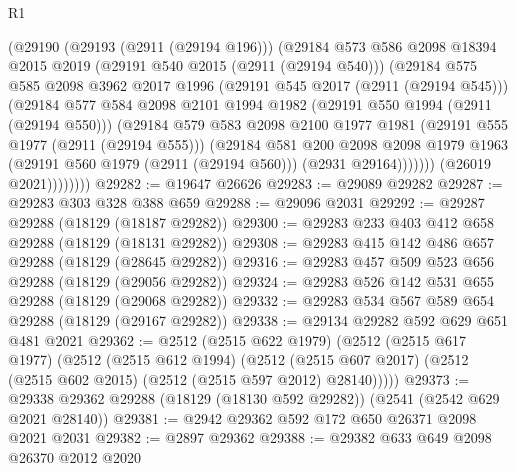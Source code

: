 \begin{lexlean}{R1}
\begin{coremodule}
                  (@29190
                    (@29193 (@2911 (@29194 @196)))
                    (@29184
                      @573
                      @586
                      @2098
                      @18394
                      @2015
                      @2019
                      (@29191 @540 @2015 (@2911 (@29194 @540)))
                      (@29184
                        @575
                        @585
                        @2098
                        @3962
                        @2017
                        @1996
                        (@29191 @545 @2017 (@2911 (@29194 @545)))
                        (@29184
                          @577
                          @584
                          @2098
                          @2101
                          @1994
                          @1982
                          (@29191 @550 @1994 (@2911 (@29194 @550)))
                          (@29184
                            @579
                            @583
                            @2098
                            @2100
                            @1977
                            @1981
                            (@29191 @555 @1977 (@2911 (@29194 @555)))
                            (@29184
                              @581
                              @200
                              @2098
                              @2098
                              @1979
                              @1963
                              (@29191 @560 @1979 (@2911 (@29194 @560)))
                              (@2931 @29164)))))))
                  (@26019 @2021))))))))
@29282 := @19647 @26626
@29283 := @29089 @29282
@29287 := @29283 @303 @328 @388 @659
@29288 := @29096 @2031
@29292 := @29287 @29288 (@18129 (@18187 @29282))
@29300 := @29283 @233 @403 @412 @658 @29288 (@18129 (@18131 @29282))
@29308 := @29283 @415 @142 @486 @657 @29288 (@18129 (@28645 @29282))
@29316 := @29283 @457 @509 @523 @656 @29288 (@18129 (@29056 @29282))
@29324 := @29283 @526 @142 @531 @655 @29288 (@18129 (@29068 @29282))
@29332 := @29283 @534 @567 @589 @654 @29288 (@18129 (@29167 @29282))
@29338 := @29134 @29282 @592 @629 @651 @481 @2021
@29362 := @2512
    (@2515 @622 @1979)
    (@2512
      (@2515 @617 @1977)
      (@2512
        (@2515 @612 @1994)
        (@2512 (@2515 @607 @2017) (@2512 (@2515 @602 @2015) (@2512 (@2515 @597 @2012) @28140)))))
@29373 := @29338 @29362 @29288 (@18129 (@18130 @592 @29282)) (@2541 (@2542 @629 @2021 @28140))
@29381 := @2942 @29362 @592 @172 @650 @26371 @2098 @2021 @2031
@29382 := @2897 @29362
@29388 := @29382 @633 @649 @2098 @26370 @2012 @2020

\end{coremodule}
\end{lexlean}
